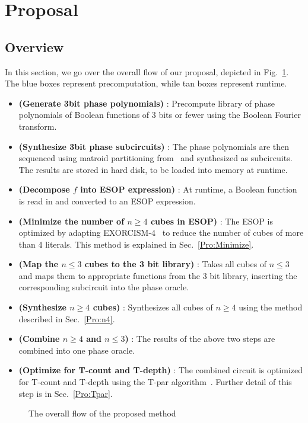 
\section{Proposal}
\label{Pro}
\subsection{Overview}

In this section, we go over the overall flow of our proposal, depicted in Fig.~\ref{fig-flow}. The blue boxes
represent precomputation, while tan boxes represent runtime.

\begin{itemize}
\item \textbf{(Generate 3bit phase polynomials)} : Precompute library of phase polynomials of Boolean functions of
  3 bits or fewer using the Boolean Fourier transform.
\item \textbf{(Synthesize 3bit phase subcircuits)} : The phase polynomials are then sequenced using matroid
  partitioning from~\cite{bib-amy-matroid} and synthesized as subcircuits. The results are stored in hard disk,
  to be loaded into memory at runtime.
\item \textbf{(Decompose $f$ into ESOP expression)} : At runtime, a Boolean function is read in and converted to
  an ESOP expression.
\item \textbf{(Minimize the number of $n \geq 4$ cubes in ESOP)} : The ESOP is optimized by adapting
  EXORCISM-4~\cite{bib-exorcism} to reduce the number of cubes of more than 4 literals. This method is explained
  in Sec.~\ref{Pro:Minimize}.
\item \textbf{(Map the $n \leq 3$ cubes to the 3 bit library)} : Takes all cubes of $n \leq 3$ and maps them to 
  appropriate functions from the 3 bit library, inserting the corresponding subcircuit into the phase oracle.
\item \textbf{(Synthesize $n \geq 4$ cubes)} : Synthesizes all cubes of $n \geq 4$ using the method described in
  Sec.~\ref{Pro:n4}.
\item \textbf{(Combine $n \geq 4$ and $n \leq 3$)} : The results of the above two steps are combined into one
  phase oracle.
\item \textbf{(Optimize for T-count and T-depth)} : The combined circuit is optimized for T-count and T-depth using
  the T-par algorithm~\cite{bib-amy-matroid}. Further detail of this step is in Sec.~\ref{Pro:Tpar}.
\end{itemize}
\begin{figure}[t]
  \centering
  \scalebox{1.0} {
    
  }
  \caption{The overall flow of the proposed method}
  \label{fig-flow}
\end{figure}


